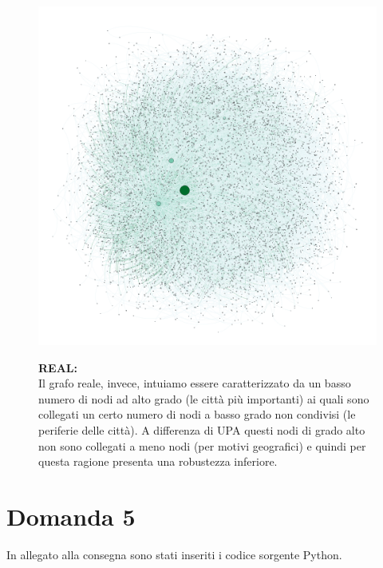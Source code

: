 \documentclass{article}
\begin{document}
\begin{figure}[H]
	\begin{minipage}{0.5\linewidth}
		\centering
		\includegraphics[width=0.9\linewidth, valign=t]{figures/real}
	\end{minipage}
	\begin{minipage}{0.55\linewidth}
		\textbf{REAL:}\\
		Il grafo reale, invece, intuiamo essere caratterizzato da un basso numero di nodi ad alto grado (le città più importanti) ai quali sono collegati un certo numero di nodi a basso grado non condivisi (le periferie delle città). A differenza di UPA questi nodi di grado alto non sono collegati a meno nodi (per motivi geografici) e quindi per questa ragione presenta una robustezza inferiore.\\
	\end{minipage}
\end{figure}

\newpage
\section*{Domanda 5}
In allegato alla consegna sono stati inseriti i codice sorgente Python.
\end{document}
